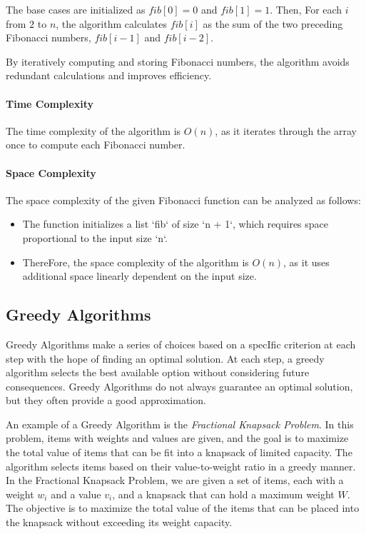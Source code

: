 \documentclass[12pt]{book} %
\begin{document}
The base cases are initialized as $fib[0] = 0$ and $fib[1] = 1$. Then, For each $i$ from $2$ to $n$, the algorithm calculates $fib[i]$ as the sum of the two preceding Fibonacci numbers, $fib[i-1]$ and $fib[i-2]$.

By iteratively computing and storing Fibonacci numbers, the algorithm avoids redundant calculations and improves efficiency.

\paragraph{Time Complexity}

The time complexity of the algorithm is $O(n)$, as it iterates through the array once to compute each Fibonacci number.
\paragraph{Space Complexity}
The space complexity of the given Fibonacci function can be analyzed as follows:

\begin{itemize}
    \item The function initializes a list `fib` of size `n + 1`, which requires space proportional to the input size `n`.
    \item ThereFore, the space complexity of the algorithm is \(O(n)\), as it uses additional space linearly dependent on the input size.
\end{itemize}

\subsection{Greedy Algorithms}
Greedy Algorithms make a series of choices based on a specIfic criterion at each step with the hope of finding an optimal solution. At each step, a greedy algorithm selects the best available option without considering future consequences. Greedy Algorithms do not always guarantee an optimal solution, but they often provide a good approximation.

An example of a Greedy Algorithm is the \textit{Fractional Knapsack Problem}. In this problem, items with weights and values are given, and the goal is to maximize the total value of items that can be fit into a knapsack of limited capacity. The algorithm selects items based on their value-to-weight ratio in a greedy manner.
In the Fractional Knapsack Problem, we are given a set of items, each with a weight $w_i$ and a value $v_i$, and a knapsack that can hold a maximum weight $W$. The objective is to maximize the total value of the items that can be placed into the knapsack without exceeding its weight capacity.
\end{document}
